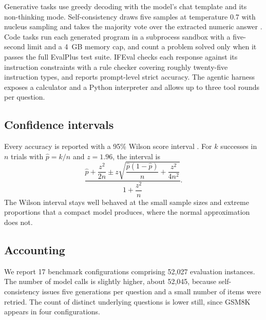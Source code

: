 Generative tasks use greedy decoding with the model's chat template and its non-thinking mode. Self-consistency draws five samples at temperature 0.7 with nucleus sampling and takes the majority vote over the extracted numeric answer \citep{wang2022selfconsistency}. Code tasks run each generated program in a subprocess sandbox with a five-second limit and a 4~GB memory cap, and count a problem solved only when it passes the full EvalPlus test suite. IFEval checks each response against its instruction constraints with a rule checker covering roughly twenty-five instruction types, and reports prompt-level strict accuracy. The agentic harness exposes a calculator and a Python interpreter and allows up to three tool rounds per question.

\subsection{Confidence intervals}
Every accuracy is reported with a 95\% Wilson score interval \citep{wilson1927}. For $k$ successes in $n$ trials with $\hat{p} = k/n$ and $z = 1.96$, the interval is
\[
\frac{\hat{p} + \dfrac{z^2}{2n} \pm z\sqrt{\dfrac{\hat{p}(1-\hat{p})}{n} + \dfrac{z^2}{4n^2}}}{1 + \dfrac{z^2}{n}}.
\]
The Wilson interval stays well behaved at the small sample sizes and extreme proportions that a compact model produces, where the normal approximation does not.

\subsection{Accounting}
We report 17 benchmark configurations comprising 52{,}027 evaluation instances. The number of model calls is slightly higher, about 52{,}045, because self-consistency issues five generations per question and a small number of items were retried. The count of distinct underlying questions is lower still, since GSM8K appears in four configurations.
